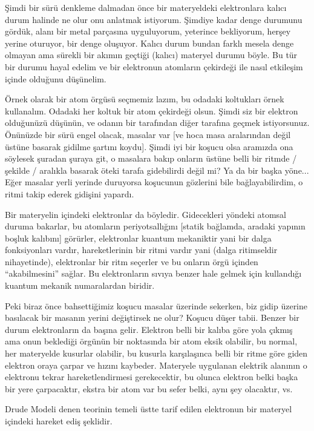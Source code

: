 \documentclass[12pt,fleqn]{article}\usepackage{../../common}
\begin{document}
Şimdi bir sürü denkleme dalmadan önce bir materyeldeki elektronlara kalıcı
durum halinde ne olur onu anlatmak istiyorum. Şimdiye kadar denge durumunu
gördük, alanı bir metal parçasına uyguluyorum, yeterince bekliyorum, herşey
yerine oturuyor, bir denge oluşuyor. Kalıcı durum bundan farklı mesela
denge olmayan ama sürekli bir akımın geçtiği (kalıcı) materyel durumu
böyle. Bu tür bir durumu hayal edelim ve bir elektronun atomların çekirdeği
ile nasıl etkileşim içinde olduğunu düşünelim.

Örnek olarak bir atom örgüsü seçmemiz lazım, bu odadaki koltukları örnek
kullanalım. Odadaki her koltuk bir atom çekirdeği olsun. Şimdi siz bir elektron
olduğunüzü düşünün, ve odanın bir tarafından diğer tarafına geçmek
istiyorsunuz. Önünüzde bir sürü engel olacak, masalar var [ve hoca masa
aralarından değil üstüne basarak gidilme şartını koydu]. Şimdi iyi bir
koşucu  olsa aramızda ona söylesek şuradan şuraya git, o masalara bakıp
onların üstüne belli bir ritmde / şekilde / aralıkla basarak öteki tarafa
gidebilirdi değil mi? Ya da bir başka yöne... Eğer masalar yerli yerinde
duruyorsa koşucunun gözlerini bile bağlayabilirdim, o ritmi takip ederek
gidişini yapardı. 

Bir materyelin içindeki elektronlar da böyledir. Gidecekleri yöndeki
atomsal duruma bakarlar, bu atomların periyotsallığını [statik bağlamda,
aradaki yapının boşluk kalıbını] görürler, elektronlar kuantum mekaniktir
yani bir dalga fonksiyonları vardır, hareketlerinin bir ritmi vardır yani
(dalga ritimseldir nihayetinde), elektronlar bir ritm seçerler ve bu
onların örgü içinden ``akabilmesini'' sağlar. Bu elektronların sıvıya
benzer hale gelmek için kullandığı kuantum mekanik numaralardan biridir.

Peki biraz önce bahsettiğimiz koşucu masalar üzerinde sekerken, biz gidip
üzerine basılacak bir masanın yerini değiştirsek ne olur? Koşucu düşer
tabii. Benzer bir durum elektronların da başına gelir. Elektron belli bir kalıba
göre yola çıkmış ama onun beklediği örgünün bir noktasında bir atom eksik
olabilir, bu normal, her materyelde kusurlar olabilir, bu kusurla karşılaşınca
belli bir ritme göre giden elektron oraya çarpar ve hızını kaybeder. Materyele
uygulanan elektrik alanının o elektronu tekrar hareketlendirmesi gerekecektir,
bu olunca elektron belki başka bir yere çarpacaktır, ekstra bir atom var bu
sefer belki, aynı şey olacaktır, vs.

Drude Modeli denen teorinin temeli üstte tarif edilen elektronun bir materyel
içindeki hareket ediş şeklidir.
\end{document}
